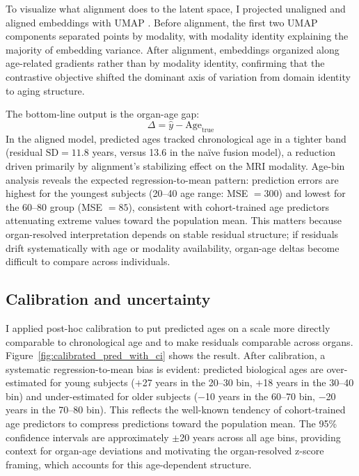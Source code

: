 \documentclass[10pt,twocolumn]{article}
\begin{document}
To visualize what alignment does to the latent space, I projected unaligned and aligned embeddings
with UMAP \cite{mcinnes2018umap}. Before alignment, the first two UMAP components separated
points by modality, with modality identity explaining the majority of embedding variance. After
alignment, embeddings organized along age-related gradients rather than by modality identity,
confirming that the contrastive objective shifted the dominant axis of variation from domain
identity to aging structure.

The bottom-line output is the organ-age gap:
\begin{equation}
\Delta = \hat{y} - \mathrm{Age}_{\text{true}}
\label{eq:agegap}
\end{equation}
In the aligned model, predicted ages tracked chronological age in a tighter band (residual
$\mathrm{SD} = 11.8$ years, versus 13.6 in the na\"ive fusion model), a reduction driven
primarily by alignment's stabilizing effect on the MRI modality. Age-bin analysis reveals
the expected regression-to-mean pattern: prediction errors are highest for the youngest
subjects (20--40 age range: MSE $= 300$) and lowest for the 60--80 group (MSE $= 85$),
consistent with cohort-trained age predictors attenuating extreme values toward the population
mean. This matters because organ-resolved interpretation depends on stable residual structure;
if residuals drift systematically with age or modality availability, organ-age deltas become
difficult to compare across individuals.

\subsection{Calibration and uncertainty}

I applied post-hoc calibration to put predicted ages on a scale more directly comparable to
chronological age and to make residuals comparable across organs.
Figure~\ref{fig:calibrated_pred_with_ci} shows the result. After calibration, a systematic regression-to-mean bias is evident: predicted biological ages
are over-estimated for young subjects ($+$27 years in the 20--30 bin, $+$18 years in the 30--40
bin) and under-estimated for older subjects ($-$10 years in the 60--70 bin, $-$20 years in the
70--80 bin). This reflects the well-known tendency of cohort-trained age predictors to compress
predictions toward the population mean. The 95\% confidence intervals are approximately
$\pm$20 years across all age bins, providing context for organ-age deviations and motivating
the organ-resolved z-score framing, which accounts for this age-dependent structure.
\end{document}
